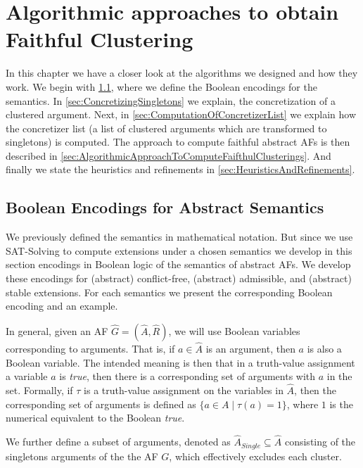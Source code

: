 \chapter{Algorithmic approaches to obtain Faithful Clustering}
In this chapter we have a closer look at the algorithms we designed and how they work.
We begin with \cref{sec:Encodings}, where we define the Boolean encodings for the semantics. In \cref{sec:ConcretizingSingletons} we explain, the concretization of a clustered argument. Next, in \cref{sec:ComputationOfConcretizerList} we explain how the concretizer list (a list of clustered arguments which are transformed to singletons) is computed. The approach to compute faithful abstract AFs is then described in \cref{sec:AlgorithmicApproachToComputeFaifthulClusterings}. And finally we state the heuristics and refinements in \cref{sec:HeuristicsAndRefinements}.


\section{Boolean Encodings for Abstract Semantics}
\label{sec:Encodings}
We previously defined the semantics in mathematical notation. But since we use SAT-Solving to compute extensions under a chosen semantics we develop in this section encodings in Boolean logic of the semantics of abstract AFs. We develop these encodings for (abstract) conflict-free, (abstract) admissible, and (abstract) stable extensions. For each semantics we present the corresponding Boolean encoding and an example.

In general, given an AF $\hat{G}=(\hat{A}, \hat{R})$, we will use Boolean variables corresponding to arguments. That is, if $a \in \hat{A}$ is an argument, then $a$ is also a Boolean variable. The intended meaning is then that in a truth-value assignment a variable $a$ is \emph{true}, then there is a corresponding set of arguments with $a$ in the set. Formally, if $\tau$ is a truth-value assignment on the variables in $\hat{A}$, then the corresponding set of arguments is defined as $\{a \in A \mid \tau(a) = 1\}$, where $1$ is the numerical equivalent to the Boolean \emph{true}.

We further define a subset of arguments, denoted as $\hat{A}_{\mathit{Single}} \subseteq \hat{A}$ consisting of the singletons arguments of the the AF $G$, which effectively excludes each cluster.


